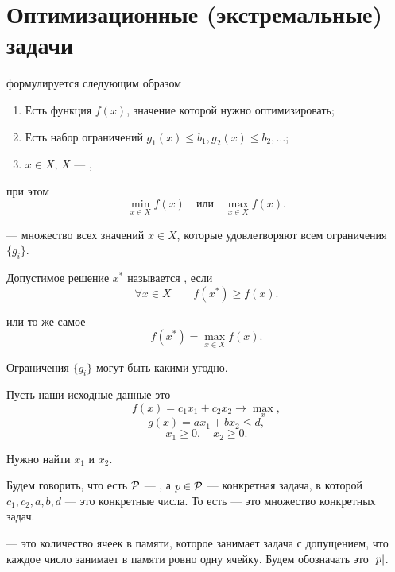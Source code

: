 \section{Оптимизационные (экстремальные) задачи}


 формулируется следующим образом

\begin{enumerate}[nosep]
	\item Есть функция $f(x)$, значение которой нужно оптимизировать;
	
	\item Есть набор ограничений $g_1(x) \le b_1, g_2(x) \le b_2, \dots$;
	
	\item $x \in X$, $X$ --- ,
\end{enumerate}

при этом 
\[
\min_{x \in X} f(x) \quad \text{или} \quad \max_{x \in X} f(x).
\]


 --- множество всех значений $x \in X$, которые удовлетворяют всем ограничения $\{g_i\}$.


Допустимое решение $x^*$ называется , если
\[
\forall x \in X \qquad f(x^*) \ge f(x).	
\]

или то же самое
\[
f(x^*) = \max_{x \in X} f(x).	
\]

\remark

Ограничения $\{g_i\}$ могут быть какими угодно.

\example

Пусть наши исходные данные это
\[f(x) = c_1 x_1 + c_2 x_2 \to \max_x,\]
\[g(x) = ax_1 + bx_2 \le d,\]
\[x_1 \ge 0, \quad x_2 \ge 0.\]

Нужно найти $x_1$ и $x_2$.


Будем говорить, что есть $\P$ --- , а $p \in \P$ --- конкретная задача, в которой $c_1, c_2, a, b, d$ --- это конкретные числа. То есть  --- это множество конкретных задач.


 --- это количество ячеек в памяти, которое занимает задача с допущением, что каждое число занимает в памяти ровно одну ячейку. Будем обозначать это $\abs{p}$.

